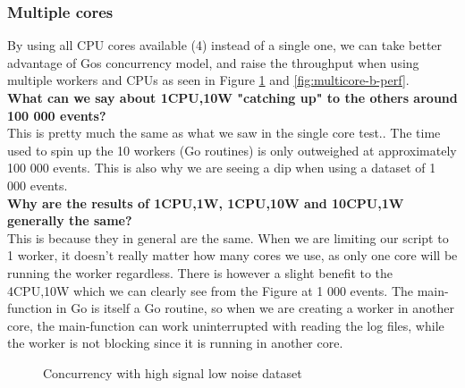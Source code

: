\subsubsection{Multiple cores}

By using all CPU cores available (4) instead of a single one, we can take better advantage of Gos concurrency model, and raise the throughput when using multiple workers and CPUs as seen in Figure \ref{fig:multicore-hsln-perf} and \ref{fig:multicore-b-perf}.\\
\textbf{What can we say about 1CPU,10W "catching up" to the others around 100 000 events?}\\
This is pretty much the same as what we saw in the single core test.. The time used to spin up the 10 workers (Go routines) is only outweighed at approximately 100 000 events. This is also why we are seeing a dip when using a dataset of 1 000 events.\\
\textbf{Why are the results of 1CPU,1W, 1CPU,10W and 10CPU,1W generally the same?}\\
This is because they in general are the same. When we are limiting our script to 1 worker, it doesn't really matter how many cores we use, as only one core will be running the worker regardless. There is however a slight benefit to the 4CPU,10W which we can clearly see from the Figure at 1 000 events. The main-function in Go is itself a Go routine, so when we are creating a worker in another core, the main-function can work uninterrupted with reading the log files, while the worker is not blocking since it is running in another core.

\begin{figure}[ht]
\centering
\pgfplotsset{scaled y ticks=false}
\caption{Concurrency with high signal low noise dataset}
\label{fig:multicore-hsln-perf}
\end{figure}

